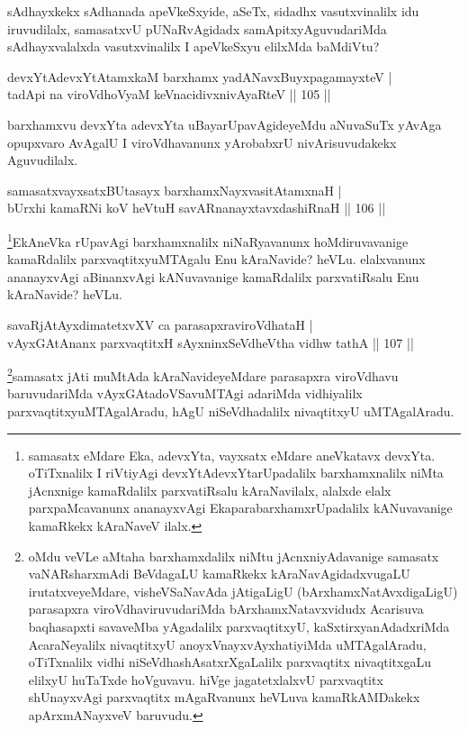 \begin{artha}
sAdhayxkekx sAdhanada apeVkeSxyide, aSeTx, sidadhx vasutxvinalilx idu iruvudilalx, samasatxvU pUNaRvAgidadx samApitxyAguvudariMda sAdhayxvalalxda vasutxvinalilx I apeVkeSxyu elilxMda baMdiVtu?
\end{artha}

\begin{shl}
devxYtAdevxYtAtamxkaM barxhamx yadA\s NavxBuyxpagamayxteV   | \\
tadA\s pi na viroVdhoV\s yaM keVnacidivxnivAyaRteV \hfill||  105 ||  
\end{shl}

\begin{artha}
barxhamxvu devxYta adevxYta uBayarUpavAgideyeMdu aNuvaSuTx yAvAga opupxvaro AvAgalU I viroVdhavanunx yArobabxrU nivArisuvudakekx Aguvudilalx.
\end{artha}

\begin{shl}
samasatxvayxsatxBUtasayx barxhamxNayxvasitAtamxnaH  | \\
bUrxhi kamaRNi koV heVtuH savARnanayxtavxdashiRnaH \hfill||  106 ||  
\end{shl}

\begin{artha}
\footnote{samasatx eMdare Eka, adevxYta, vayxsatx eMdare aneVkatavx devxYta. oTiTxnalilx I riVtiyAgi devxYtAdevxYtarUpadalilx barxhamxnalilx niMta jAcnxnige kamaRdalilx parxvatiRsalu kAraNavilalx, alalxde elalx parxpaMcavanunx ananayxvAgi EkaparabarxhamxrUpadalilx kANuvavanige kamaRkekx kAraNaveV ilalx.}EkAneVka rUpavAgi barxhamxnalilx niNaRyavanunx hoMdiruvavanige kamaRdalilx parxvaqtitxyuMTAgalu Enu kAraNavide? heVLu. elalxvanunx ananayxvAgi aBinanxvAgi kANuvavanige kamaRdalilx parxvatiRsalu Enu kAraNavide? heVLu.
\end{artha}

\begin{shl}
savaRjAtAyxdimatetxvXV ca parasapxraviroVdhataH  | \\
vAyxGAtAnanx parxvaqtitxH sAyxninxSeVdheV\s tha vidhw tathA \hfill||  107 ||  
\end{shl}

\begin{artha}
\footnote{oMdu veVLe aMtaha barxhamxdalilx niMtu jAcnxniyAdavanige samasatx vaNARsharxmAdi BeVdagaLU kamaRkekx kAraNavAgidadxvugaLU irutatxveyeMdare, visheVSaNavAda jAtigaLigU (bArxhamxNatAvxdigaLigU) parasapxra viroVdhaviruvudariMda bArxhamxNatavxvidudx Acarisuva baqhasapxti savaveMba yAgadalilx parxvaqtitxyU, kaSxtirxyanAdadxriMda AcaraNeyalilx nivaqtitxyU anoyxVnayxvAyxhatiyiMda uMTAgalAradu, oTiTxnalilx vidhi niSeVdhashAsatxrXgaLalilx parxvaqtitx nivaqtitxgaLu elilxyU huTaTxde hoVguvavu. hiVge jagatetxlalxvU parxvaqtitx shUnayxvAgi parxvaqtitx mAgaRvanunx heVLuva kamaRkAMDakekx apArxmANayxveV baruvudu.}samasatx jAti muMtAda kAraNavideyeMdare parasapxra viroVdhavu baruvudariMda vAyxGAtadoVSavuMTAgi adariMda vidhiyalilx parxvaqtitxyuMTAgalAradu, hAgU niSeVdhadalilx nivaqtitxyU uMTAgalAradu.
\end{artha}

